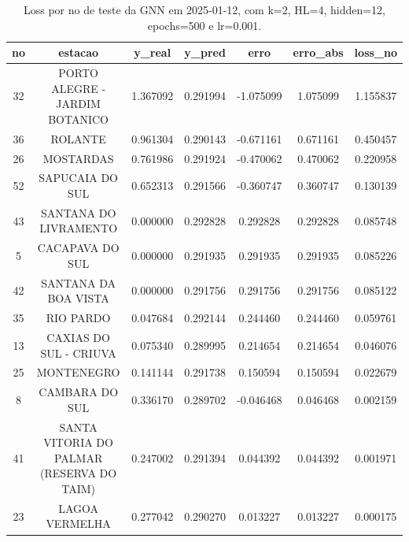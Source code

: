 \begin{table}[h]
\centering
\caption{Loss por no de teste da GNN em 2025-01-12, com k=2, HL=4, hidden=12, epochs=500 e lr=0.001.}
\label{tab:gnn_loss_k2_hl4_h12_e500_d20250112}
\begin{tabular}{ccccccc}
\toprule
no & estacao & y\_real & y\_pred & erro & erro\_abs & loss\_no \\
\midrule
32 & PORTO ALEGRE - JARDIM BOTANICO & 1.367092 & 0.291994 & -1.075099 & 1.075099 & 1.155837 \\
36 & ROLANTE & 0.961304 & 0.290143 & -0.671161 & 0.671161 & 0.450457 \\
26 & MOSTARDAS & 0.761986 & 0.291924 & -0.470062 & 0.470062 & 0.220958 \\
52 & SAPUCAIA DO SUL & 0.652313 & 0.291566 & -0.360747 & 0.360747 & 0.130139 \\
43 & SANTANA DO LIVRAMENTO & 0.000000 & 0.292828 & 0.292828 & 0.292828 & 0.085748 \\
5 & CACAPAVA DO SUL & 0.000000 & 0.291935 & 0.291935 & 0.291935 & 0.085226 \\
42 & SANTANA DA BOA VISTA & 0.000000 & 0.291756 & 0.291756 & 0.291756 & 0.085122 \\
35 & RIO PARDO & 0.047684 & 0.292144 & 0.244460 & 0.244460 & 0.059761 \\
13 & CAXIAS DO SUL - CRIUVA & 0.075340 & 0.289995 & 0.214654 & 0.214654 & 0.046076 \\
25 & MONTENEGRO & 0.141144 & 0.291738 & 0.150594 & 0.150594 & 0.022679 \\
8 & CAMBARA DO SUL & 0.336170 & 0.289702 & -0.046468 & 0.046468 & 0.002159 \\
41 & SANTA VITORIA DO PALMAR (RESERVA DO TAIM) & 0.247002 & 0.291394 & 0.044392 & 0.044392 & 0.001971 \\
23 & LAGOA VERMELHA & 0.277042 & 0.290270 & 0.013227 & 0.013227 & 0.000175 \\
\bottomrule
\end{tabular}
\end{table}
